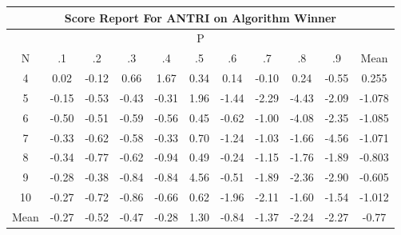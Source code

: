 \documentclass[11pt,a4paper]{report}
\begin{document}
\begin{longtable}{ | c || c | c | c | c | c | c | c | c | c || c |}
\hline
\multicolumn{11}{|c|}{ Score Report For ANTRI on Algorithm Winner} \\
\hline
\multicolumn{11}{|c|}{ P } \\
\hline
N & .1 & .2 & .3 & .4 & .5 & .6 & .7 & .8 & .9 & Mean\\
 \hline
 \hline
 \endhead
  4 &  \cellcolor[HTML]{FFFFFF} 0.02 &  \cellcolor[HTML]{FFFFFF} -0.12 &  \cellcolor[HTML]{EFEFFF} 0.66 &  \cellcolor[HTML]{D7D7FF} 1.67 &  \cellcolor[HTML]{F7F7FF} 0.34 &  \cellcolor[HTML]{FFFFFF} 0.14 &  \cellcolor[HTML]{FFFFFF} -0.10 &  \cellcolor[HTML]{F7F7FF} 0.24 &  \cellcolor[HTML]{FFEFEF} -0.55 & 0.255 \\
  5 &  \cellcolor[HTML]{FFFFFF} -0.15 &  \cellcolor[HTML]{FFEFEF} -0.53 &  \cellcolor[HTML]{FFF7F7} -0.43 &  \cellcolor[HTML]{FFF7F7} -0.31 &  \cellcolor[HTML]{CFCFFF} 1.96 &  \cellcolor[HTML]{FFD7D7} -1.44 &  \cellcolor[HTML]{FFC7C7} -2.29 &  \cellcolor[HTML]{FF8F8F} -4.43 &  \cellcolor[HTML]{FFC7C7} -2.09 & -1.078 \\
  6 &  \cellcolor[HTML]{FFEFEF} -0.50 &  \cellcolor[HTML]{FFEFEF} -0.51 &  \cellcolor[HTML]{FFEFEF} -0.59 &  \cellcolor[HTML]{FFEFEF} -0.56 &  \cellcolor[HTML]{F7F7FF} 0.45 &  \cellcolor[HTML]{FFEFEF} -0.62 &  \cellcolor[HTML]{FFE7E7} -1.00 &  \cellcolor[HTML]{FF9797} -4.08 &  \cellcolor[HTML]{FFC7C7} -2.35 & -1.085 \\
  7 &  \cellcolor[HTML]{FFF7F7} -0.33 &  \cellcolor[HTML]{FFEFEF} -0.62 &  \cellcolor[HTML]{FFEFEF} -0.58 &  \cellcolor[HTML]{FFF7F7} -0.33 &  \cellcolor[HTML]{EFEFFF} 0.70 &  \cellcolor[HTML]{FFDFDF} -1.24 &  \cellcolor[HTML]{FFE7E7} -1.03 &  \cellcolor[HTML]{FFD7D7} -1.66 &  \cellcolor[HTML]{FF8F8F} -4.56 & -1.071 \\
  8 &  \cellcolor[HTML]{FFF7F7} -0.34 &  \cellcolor[HTML]{FFEFEF} -0.77 &  \cellcolor[HTML]{FFEFEF} -0.62 &  \cellcolor[HTML]{FFE7E7} -0.94 &  \cellcolor[HTML]{EFEFFF} 0.49 &  \cellcolor[HTML]{FFF7F7} -0.24 &  \cellcolor[HTML]{FFDFDF} -1.15 &  \cellcolor[HTML]{FFCFCF} -1.76 &  \cellcolor[HTML]{FFCFCF} -1.89 & -0.803 \\
  9 &  \cellcolor[HTML]{FFF7F7} -0.28 &  \cellcolor[HTML]{FFF7F7} -0.38 &  \cellcolor[HTML]{FFE7E7} -0.84 &  \cellcolor[HTML]{FFE7E7} -0.84 &  \cellcolor[HTML]{8F8FFF} 4.56 &  \cellcolor[HTML]{FFEFEF} -0.51 &  \cellcolor[HTML]{FFCFCF} -1.89 &  \cellcolor[HTML]{FFC7C7} -2.36 &  \cellcolor[HTML]{FFB7B7} -2.90 & -0.605 \\
  10 &  \cellcolor[HTML]{FFF7F7} -0.27 &  \cellcolor[HTML]{FFEFEF} -0.72 &  \cellcolor[HTML]{FFE7E7} -0.86 &  \cellcolor[HTML]{FFEFEF} -0.66 &  \cellcolor[HTML]{EFEFFF} 0.62 &  \cellcolor[HTML]{FFCFCF} -1.96 &  \cellcolor[HTML]{FFC7C7} -2.11 &  \cellcolor[HTML]{FFD7D7} -1.60 &  \cellcolor[HTML]{FFD7D7} -1.54 & -1.012 \\
 \hline
 \hline
Mean &  \cellcolor[HTML]{FFF7F7} -0.27 &  \cellcolor[HTML]{FFEFEF} -0.52 &  \cellcolor[HTML]{FFF7F7} -0.47 &  \cellcolor[HTML]{FFF7F7} -0.28 &  \cellcolor[HTML]{DFDFFF} 1.30 &  \cellcolor[HTML]{FFE7E7} -0.84 &  \cellcolor[HTML]{FFDFDF} -1.37 &  \cellcolor[HTML]{FFC7C7} -2.24 &  \cellcolor[HTML]{FFC7C7} -2.27 &  \cellcolor[HTML]{FFEFEF} -0.77
\end{longtable}
\end{document}
